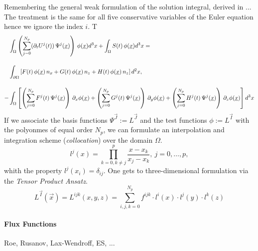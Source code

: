 Remembering the general weak formulation of the solution integral, derived in ...
The treatment is the same for all five conservative variables of the Euler
equation hence we ignore the index $i$. T
\begin{align}
    &\int_\Omega \left(\sum^{N_p}_{j=0} (\partial_t U^j(t)) \, \Psi^j(\vec{x})\right)\,\phi(\vec{x}) d^3x 
        + \int_\Omega S(t) \, \phi(\vec{x}) d^3x = \nonumber \br
         &\int_{\partial\Omega} \left[F(t)\,\phi(\vec{x})\,n_x + G(t)\,\phi(\vec{x})\,n_z + H(t)\,\phi(\vec{x})\,n_z \right] d^2x, \br
        -&\int_\Omega \left[
              \left(\sum^{N_p}_{j=0} F^j(t)\,\Psi^j(\vec{x})\right)\,\partial_x \phi(\vec{x}) 
            + \left(\sum^{N_p}_{j=0} G^j(t)\,\Psi^j(\vec{x})\right)\,\partial_y \phi(\vec{x})
            + \left(\sum^{N_p}_{j=0} H^j(t)\,\Psi^j(\vec{x})\right)\,\partial_z \phi(\vec{x}) \right] d^3x \nonumber
\end{align}
If we associate the basis functions $\Psi^{\vec{J}} := L^{\vec{J}}$ and the test functions $\phi := L^{\vec{I}}$ with the
 polyonmes of equal order $N_p$, we can formulate an interpolation and
integration scheme (\emph{collocation}) over the domain $\Omega$.
\begin{equation}
l^j(x) = \prod^p_{k=0,k\neq j} \frac{x-x_k}{x_j-x_k}, \ j = 0,\dots,p,
\end{equation}
whith the  property $l^j(x_i) = \delta_{ij}$. One gets to three-dimensional
formulation via the \emph{Tensor Product Ansatz}.
\begin{equation}
\label{eq-tensor-ansatz}
    L^{\vec{I}}(\vec{x}) = L^{ijk}(x,y,z) = \sum^{N_p}_{i,j,k = 0} f^{ijk} \cdot l^i(x) \cdot l^j(y) \cdot l^k(z)
\end{equation}






\paragraph{Flux Functions}

Roe, Rusanov, Lax-Wendroff, ES, ...
